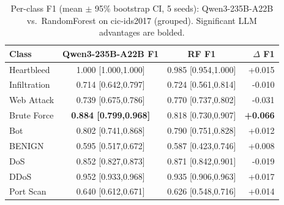 \begin{table}[t]
\caption{Per-class F1 (mean $\pm$ 95\% bootstrap CI, 5 seeds): Qwen3-235B-A22B vs.\ RandomForest on cic-ids2017 (grouped). Significant LLM advantages are bolded.}
\label{t:r2_perclass}
\begin{tabular}{lccr}
\hline
Class & Qwen3-235B-A22B F1 & RF F1 & $\Delta$ F1 \\
\hline
Heartbleed & 1.000 [1.000,1.000] & 0.985 [0.954,1.000] & +0.015 \\
Infiltration & 0.714 [0.642,0.797] & 0.724 [0.561,0.814] & -0.010 \\
Web Attack & 0.739 [0.675,0.786] & 0.770 [0.737,0.802] & -0.031 \\
Brute Force & \textbf{0.884 [0.799,0.968]} & 0.818 [0.730,0.907] & \textbf{+0.066} \\
Bot & 0.802 [0.741,0.868] & 0.790 [0.751,0.828] & +0.012 \\
BENIGN & 0.595 [0.517,0.672] & 0.587 [0.423,0.746] & +0.008 \\
DoS & 0.852 [0.827,0.873] & 0.871 [0.842,0.901] & -0.019 \\
DDoS & 0.952 [0.933,0.968] & 0.935 [0.906,0.963] & +0.017 \\
Port Scan & 0.640 [0.612,0.671] & 0.626 [0.548,0.716] & +0.014 \\
\hline
\end{tabular}
\end{table}